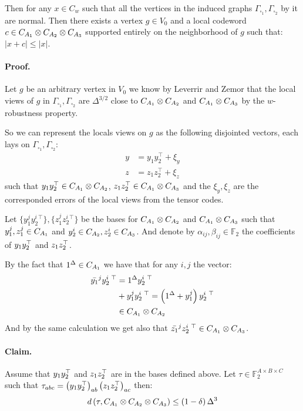 \documentclass{article}
\begin{document}
\begin{multicols*}{2}
      Then for any $x \in C_{w}$ such that all the vertices in the induced graphs $\Gamma_{\square_{1}},\Gamma_{\square_{2}}$  by it are normal. 
	Then there exists a vertex $ g \in V_{0} $ and a local codeword $ c \in C_{A_{1}} \otimes C_{A_{2}} \otimes C_{A_{3}} $ supported entirely on the neighborhood of $ g $ such that: 
	$ |x + c| \le |x| $.


	\paragraph{Proof.} Let $g$ be an arbitrary vertex in $V_{0}$ we know by Leverrir and Zemor that the local views of $g$ in  $\Gamma_{\square_{1}},\Gamma_{\square_{2}}$ are $\Delta^{3/2}$ close to 
      $C_{A_{1}} \otimes C_{A_{2}} $ and $ C_{A_{1}} \otimes C_{A_{3}} $ by the $w$-robustness property. 

	So we can represent the locals views on $g$ as the following disjointed vectors, each lays on $\Gamma_{\square_1},\Gamma_{\square_2}$:
	\begin{equation*}
	  \begin{split}
	    y &= y_{1}y_{2}^{\top} + \xi_{y} \\ 
	    z &= z_{1}z_{2}^{\top} + \xi_{z}
	  \end{split}
	\end{equation*}
	such that $ y_{1}y_{2}^{\top} \in C_{A_{1}} \otimes C_{A_{2}} $,  $z_{1}z_{2}^{\top}\in C_{A_{1}} \otimes C_{A_{3}} $ and the $\xi_{y}, \xi_{z} $ are the corresponded errors of the local views from the tensor codes. 
 
	Let $ \{ y_{1}^{j}y_{2}^{i \ \top} \} ,\{ z_{1}^{j}z_{2}^{i \ \top} \}  $ be the bases for $ C_{A_{1}} \otimes C_{A_{2}} $ and $ C_{A_{1}} \otimes C_{A_{3}} $ such that $ y_{1}^{j}, z_{1}^{j} \in C_{A_{1}} $ and $ y_{2}^{i} \in C_{A_{2}}, z_{2}^{i} \in C_{A_{3}} $.  
	And denote by $\alpha_{ij},\beta_{ij} \in \mathbb{F}_2 $ the coefficients of $y_{1}y_{2}^{\top}$ and $z_{1}z_{2}^{\top}$. 

	By the fact that $1^\Delta \in C_{A_{1}}$ we have that for any $i,j$ the vector: 
	\begin{equation*}
	  \begin{split}
	  \bar{y_{1}}^{j}y_{2}^{i \ \top} & =  1^\Delta y_{2}^{i \ \top} \\ 
	    & + y_{1}^{j}y_{2}^{i \ \top} = \left(1^\Delta +  y_{1}^{j} \right)y_{2}^{i \ \top} \\
	    & \in C_{A_{1}} \otimes C_{A_{2}}
	  \end{split}
	\end{equation*}
      And by the same calculation we get also that $ \bar{z_{1}}^{j}z_{2}^{i \ \top} \in C_{A_{1}} \otimes C_{A_{3}}$.

      \paragraph{Claim.} Assume that $ y_{1}y_{2}^{\top} $ and $ z_{1}z_{2}^{\top} $ are in the  bases defined above. Let $\tau \in \mathbb{F}_{2}^{A\times B\times C} $ such that $ \tau_{abc} = \left( y_{1}y_{2}^{\top} \right)_{ab}\left( z_{1}z_{2}^{\top} \right)_{ac} $ then: 
      \begin{equation*}	
      d\left( \tau, C_{A_{1}} \otimes C_{A_{2}} \otimes C_{A_{3}} \right) \le \left( 1-\delta \right)\Delta^{3}  
      \end{equation*}

\end{multicols*}
\end{document}
